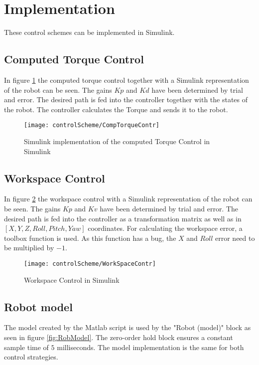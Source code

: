 \section{Implementation}

These control schemes can be implemented in Simulink.  

\subsection{Computed Torque Control}
In figure \ref{fig:CompTorqueContr} the computed torque control together with a Simulink representation of the robot can be seen. 
The gains $Kp$ and $Kd$ have been determined by trial and error. 
The desired path is fed into the controller together with the states of the robot. The controller calculates the Torque and sends it to the robot.


\begin{figure}[H]
	\texttt{[image: controlScheme/CompTorqueContr]}
	\caption{Simulink implementation of the computed Torque Control in Simulink}
	\label{fig:CompTorqueContr}
\end{figure}



\subsection{Workspace Control}
In figure \ref{fig:WorkSpaceContr} the workspace control with a Simulink representation of the robot can be seen.
The gains $Kp$ and $Kv$ have been determined by trial and error.
The desired path is fed into the controller as a transformation matrix as well as in $[X,Y,Z,Roll,Pitch,Yaw]$ coordinates.
For calculating the workspace error, a toolbox function is used. As this function has a bug, the $X$ and $Roll$ error need to be multiplied by $-1$.

\begin{figure}[H]
	\texttt{[image: controlScheme/WorkSpaceContr]}
	\caption{Workspace Control in Simulink}
	\label{fig:WorkSpaceContr}
\end{figure}


\subsection{Robot model}
The model created by the Matlab script is used by the "Robot (model)" block as seen in figure \ref{fig:RobModel}. The zero-order hold block ensures a constant sample time of $5$ milliseconds. The model implementation is the same for both control strategies.

